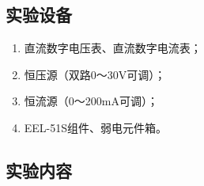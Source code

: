 \documentclass[UTF8]{article}
\begin{document}
        \subsection{实验设备}
            \begin{enumerate}[label=\textbf{\arabic*}.]
                \item 直流数字电压表、直流数字电流表；
                \item 恒压源（双路0～30V可调）；
                \item 恒流源（0～200mA可调）；
                \item EEL-51S组件、弱电元件箱。
            \end{enumerate}
        \subsection{实验内容}
\end{document}
